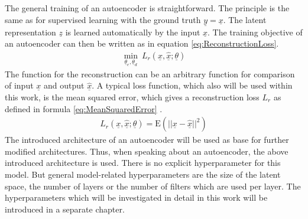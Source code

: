 \documentclass[12pt,DIV14,BCOR12mm,a4paper,footexclude,headinclude,halfparskip-,twoside,openright,cleardoubleempty,idxtotoc,bibtotoc,listtotoc,abstracton]{scrreprt} %
\numberwithin{equation}{chapter}
\begin{document}
The general training of an autoencoder is straightforward. The principle is the same as for supervised learning with the ground truth $\underline{y} = \underline{x}$. The latent representation $\underline{z}$ is learned automatically by the input $\underline{x}$. The training objective of an autoencoder can then be written as in equation \ref{eq:ReconstructionLoss}.
\begin{align}
	 \underset{\underline{\theta}_e,\underline{\theta}_d}\min\ L_r(\underline{x},\hat{\underline{x}};\underline{\theta})\label{eq:ReconstructionLoss}
\end{align}
The function for the reconstruction can be an arbitrary function for comparison of input $\underline{x}$ and output $\hat{\underline{x}}$. A typical loss function, which also will be used within this work, is the mean squared error, which gives a reconstruction loss $L_r$ as defined in formula \ref{eq:MeanSquaredError} \cite{LectureNotes_DeepLearning}.
\begin{align}
	 L_r(\underline{x},\hat{\underline{x}};\underline{\theta}) = \textrm{E}(||\underline{x}-\hat{\underline{x}}||^{2})\label{eq:MeanSquaredError}
\end{align}
The introduced architecture of an autoencoder will be used as base for further modified architectures. Thus, when speaking about an autoencoder, the above introduced architecture is used. There is no explicit hyperparameter for this model. But general model-related hyperparameters are the size of the latent space, the number of layers or the number of filters which are used per layer. The hyperparameters which will be investigated in detail in this work will be introduced in a separate chapter.
\end{document}
